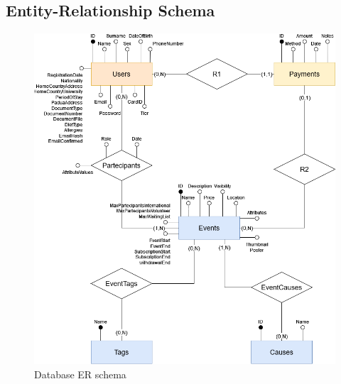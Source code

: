 \subsection{Entity-Relationship Schema}

\begin{figure}[h!]
    \centering
    \includegraphics[width=1\textwidth]{images/ERSchema.png}
    \caption{Database ER schema}
    \label{fig:er_schema}
\end{figure}


\lipsum[1]